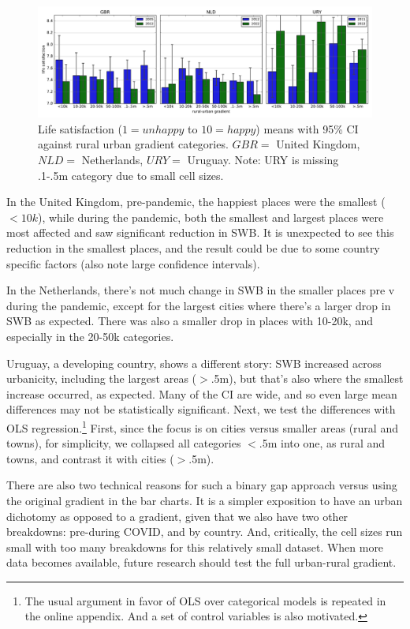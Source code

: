\documentclass[10pt, letterpaper]{article}
\begin{document}
\begin{spacing}{1.4}
\begin{figure}[H]
 \includegraphics[width=7in]{bar.pdf}\centering
\caption{\label{bar2}Life satisfaction ($1=unhappy$ to $10=happy$) means with 95\% CI against rural urban gradient categories. $GBR=$ United Kingdom, $NLD=$ Netherlands, $URY=$ Uruguay. Note: URY is missing .1-.5m category due to small cell sizes.}
 \end{figure}

In the United Kingdom, pre-pandemic, the happiest places were the smallest
($<10k$), while during the pandemic, both the smallest and largest places were
most affected and saw significant reduction in SWB. It is unexpected to see this
reduction in the smallest places, and the result could be due to some country
specific factors (also note large confidence intervals).

In the Netherlands, there's not much change in SWB in the smaller places pre v during the pandemic, except for the largest cities where there's a larger drop in SWB as expected. There was also a smaller drop in places with 10-20k, and especially in the 20-50k categories. 

Uruguay, a developing country, shows a different story: SWB increased across urbanicity, including the largest areas ($>$.5m), but that's also where the smallest increase occurred, as expected. Many of the CI are wide, and so even large mean differences may not be
statistically significant.  
%
Next, we test the differences with OLS regression.\footnote{The usual argument in
  favor of OLS over categorical models is repeated in the online appendix. And a set
of control variables is also motivated.} First, since the focus is on cities versus smaller areas (rural and towns), for simplicity, we collapsed all categories $<$.5m into one, as rural and towns, and contrast it with cities ($>$.5m). 


There are also two technical reasons for such a binary gap approach versus using the original
gradient in the  bar charts. It is a simpler exposition to have an urban dichotomy as opposed to a gradient, given that we also have two other breakdowns: pre-during COVID, and by country. And, critically, the cell sizes run small with too many breakdowns for this relatively small dataset. When more data becomes available, future research should test the full urban-rural gradient.  


\end{spacing}
\end{document}
